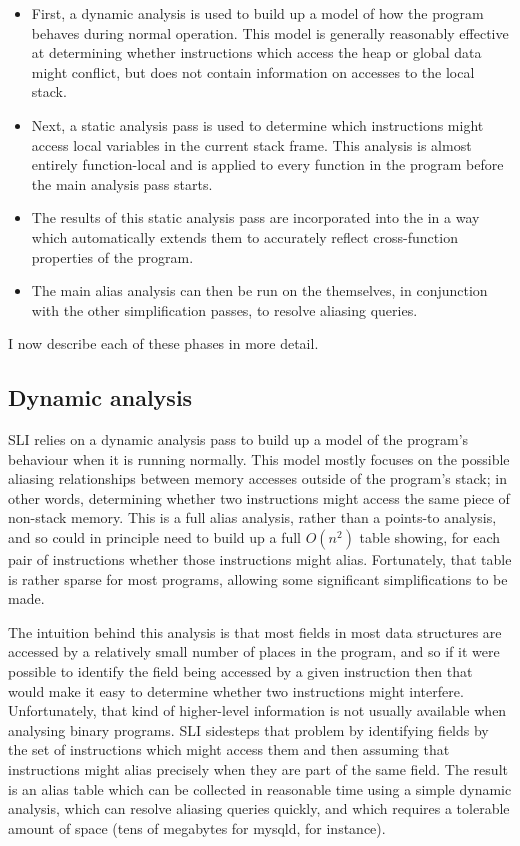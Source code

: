 \begin{itemize}
\item
  First, a dynamic analysis is used to build up a model of how the
  program behaves during normal operation.  This model is generally
  reasonably effective at determining whether instructions which
  access the heap or global data might conflict, but does not contain
  information on accesses to the local stack.
\item
  Next, a static analysis pass is used to determine which instructions
  might access local variables in the current stack frame.  This
  analysis is almost entirely function-local and is applied to every
  function in the program before the main analysis pass starts.
\item
  The results of this static analysis pass are incorporated into the
  \StateMachines in a way which automatically extends them to
  accurately reflect cross-function properties of the program.
\item
  The main alias analysis can then be run on the \StateMachines
  themselves, in conjunction with the other \StateMachine
  simplification passes, to resolve aliasing queries.
\end{itemize}

I now describe each of these phases in more detail.

\subsection{Dynamic analysis}

SLI relies on a dynamic analysis pass to build up a model of the
program's behaviour when it is running normally.  This model mostly
focuses on the possible aliasing relationships between memory accesses
outside of the program's stack; in other words, determining whether
two instructions might access the same piece of non-stack memory.
This is a full alias analysis, rather than a points-to analysis, and
so could in principle need to build up a full $O(n^2)$ table showing,
for each pair of instructions whether those instructions might alias.
Fortunately, that table is rather sparse for most programs, allowing
some significant simplifications to be made.

The intuition behind this analysis is that most fields in most data
structures are accessed by a relatively small number of places in the
program, and so if it were possible to identify the field being
accessed by a given instruction then that would make it easy to
determine whether two instructions might interfere.  Unfortunately,
that kind of higher-level information is not usually available when
analysing binary programs.  SLI sidesteps that problem by identifying
fields by the set of instructions which might access them and then
assuming that instructions might alias precisely when they are part of
the same field.  The result is an alias table which can be collected
in reasonable time using a simple dynamic analysis, which can resolve
aliasing queries quickly, and which requires a tolerable amount of
space (tens of megabytes for mysqld, for instance).

